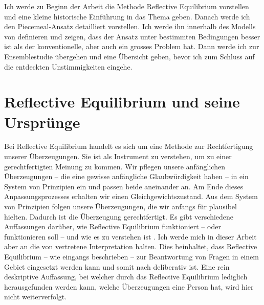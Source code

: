 \documentclass{article}
\begin{document}
Ich werde zu Beginn der Arbeit die Methode Reflective Equilibrium vorstellen und eine kleine historische Einführung in das Thema geben. Danach werde ich den Piecemeal-Ansatz detailliert vorstellen. Ich werde ihn innerhalb des Modells von \citeauthor{beisbart_making_2021} definieren und zeigen, dass der Ansatz unter bestimmten Bedingungen besser ist als der konventionelle, aber auch ein grosses Problem hat. Dann werde ich zur Ensemblestudie übergehen und eine Übersicht geben, bevor ich zum Schluss auf die entdeckten Unstimmigkeiten eingehe.

\section{Reflective Equilibrium und seine Ursprünge}

Bei Reflective Equilibrium handelt es sich um eine Methode zur Rechtfertigung unserer Überzeugungen. Sie ist als Instrument zu verstehen, um zu einer gerechtfertigten Meinung zu kommen. Wir pflegen unsere anfänglichen Überzeugungen -- die eine gewisse anfängliche Glaubwürdigkeit haben -- in ein System von Prinzipien ein und passen beide aneinander an. Am Ende dieses Anpassungsprozesses erhalten wir einen Gleichgewichtszustand. Aus dem System von Prinzipien folgen unsere Überzeugungen, die wir anfangs für plausibel hielten. Dadurch ist die Überzeugung gerechtfertigt. Es gibt verschiedene Auffassungen darüber, wie Reflective Equilibrium funktioniert -- oder funktionieren soll -- und wie es zu verstehen ist \parencite{sep-reflective-equilibrium}.
Ich werde mich in dieser Arbeit aber an die von \cite{beisbart_making_2021} vertretene Interpretation halten. Dies beinhaltet, dass Reflective Equilibrium -- wie eingangs beschrieben -- zur Beantwortung von Fragen in einem Gebiet eingesetzt werden kann und somit nach \citeauthor{freeman_rawls_2002} deliberativ ist. Eine rein deskriptive Auffassung, bei welcher durch das Reflective Equilibrium lediglich herausgefunden werden kann, welche Überzeugungen eine Person hat, wird hier nicht weiterverfolgt. \parencite[vgl.][S.~143]{freeman_rawls_2002}
\end{document}
